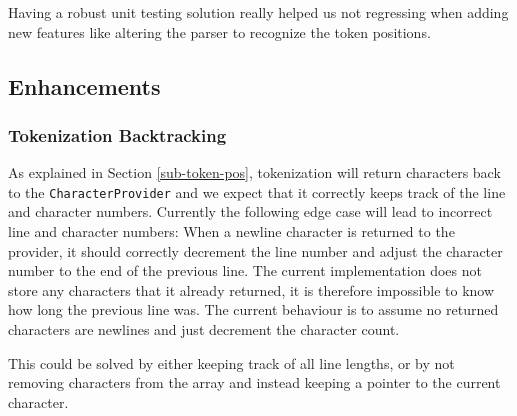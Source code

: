\documentclass[a4paper,titlepage]{article}
\numberwithin{equation}{section} %
\begin{document}
	Having a robust unit testing solution really helped us not regressing when adding new features like altering the parser to recognize the token positions.
	
	
	\subsection{Enhancements}
	
	\subsubsection*{Tokenization Backtracking}
	As explained in Section \ref{sub-token-pos}, tokenization will return characters back to the \texttt{CharacterProvider} and we expect that it correctly keeps track of the line and character numbers. Currently the following edge case will lead to incorrect line and character numbers: When a newline character is returned to the provider, it should correctly decrement the line number and adjust the character number to the end of the previous line. The current implementation does not store any characters that it already returned, it is therefore impossible to know how long the previous line was. The current behaviour is to assume no returned characters are newlines and just decrement the character count.
	
	This could be solved by either keeping track of all line lengths, or by not removing characters from the array and instead keeping a pointer to the current character.
	\newpage
	
	
	
	
	
	
\end{document}
